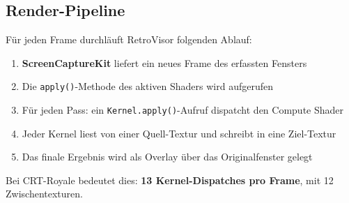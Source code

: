 \documentclass[11pt, a4paper]{article}
\begin{document}
\vspace{.75cm}
\subsection{Render-Pipeline}
\vspace{.5cm}
F\"ur jeden Frame durchl\"auft RetroVisor folgenden Ablauf: \vspace{.25cm}

\begin{enumerate}[nosep]
    \item \textbf{ScreenCaptureKit} liefert ein neues Frame des erfassten Fensters \\
    \item Die \texttt{apply()}-Methode des aktiven Shaders wird aufgerufen \\
    \item F\"ur jeden Pass: ein \texttt{Kernel.apply()}-Aufruf dispatcht den Compute Shader \\
    \item Jeder Kernel liest von einer Quell-Textur und schreibt in eine Ziel-Textur \\
    \item Das finale Ergebnis wird als Overlay \"uber das Originalfenster gelegt
\end{enumerate}
\vspace{.5cm}
Bei CRT-Royale bedeutet dies: \textbf{13 Kernel-Dispatches pro Frame}, mit 12 Zwischentexturen.

\newpage \vspace*{-1.25cm}
\end{document}
